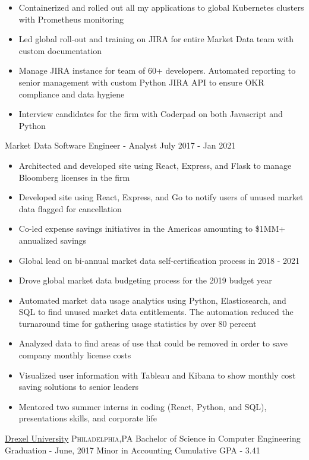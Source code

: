 \documentclass[10pt,letterpaper]{article}
\begin{document}
{{\begin{itemize}
    \item Containerized and rolled out all my applications to global Kubernetes clusters with Prometheus monitoring
    \item Led global roll-out and training on JIRA for entire Market Data team with custom documentation
    \item Manage JIRA instance for team of 60+ developers. Automated reporting to senior management with custom Python JIRA API to ensure OKR compliance and data hygiene
    \item Interview candidates for the firm with Coderpad on both Javascript and Python
    \end{itemize}}
  \headedsubsection
    {Market Data Software Engineer - Analyst}
    {July 2017 - Jan 2021}
    {\begin{itemize}
    \item Architected and developed site using React, Express, and Flask to manage Bloomberg licenses in the firm
    \item Developed site using React, Express, and Go to notify users of unused market data flagged for cancellation
    \item Co-led expense savings initiatives in the Americas amounting to \$1MM+ annualized savings
    \item Global lead on bi-annual market data self-certification process in 2018 - 2021
    \item Drove global market data budgeting process for the 2019 budget year
    \item Automated market data usage analytics using Python, Elasticsearch, and SQL to find unused market data entitlements. The automation reduced the turnaround time for gathering usage statistics by over 80 percent
    \item Analyzed data to find areas of use that could be removed in order to save company monthly license costs
    \item Visualized user information with Tableau and Kibana to show monthly cost saving solutions to senior leaders
    \item Mentored two summer interns in coding (React, Python, and SQL), presentations skills, and corporate life
    \end{itemize}}
}


\spacedhrule{0.9em}{-0.4em}


\headedsection
  {\href{http://www.drexel.edu/}{Drexel University}}
  {\textsc{Philadelphia,PA}} {%
  \headedsubsectiontwo
    {Bachelor of Science in Computer Engineering}
    {Graduation - June, 2017}
    {Minor in Accounting}
    {Cumulative GPA - 3.41}
}
\end{document}
